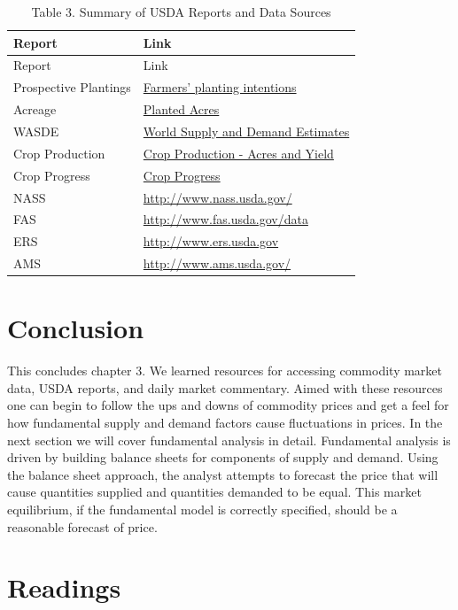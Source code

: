 \documentclass[
]{book}
\begin{document}
\begin{longtable}[]{@{}ll@{}}
\caption{Table 3. Summary of USDA Reports and Data Sources}\tabularnewline
\toprule
Report & Link\tabularnewline
\midrule
\endfirsthead
\toprule
Report & Link\tabularnewline
\midrule
\endhead
Prospective Plantings & \href{https://usda.library.cornell.edu/concern/publications/x633f100h?locale=en}{Farmers' planting intentions}\tabularnewline
Acreage & \href{https://usda.library.cornell.edu/concern/publications/j098zb09z}{Planted Acres}\tabularnewline
WASDE & \href{https://www.usda.gov/oce/commodity/wasde}{World Supply and Demand Estimates}\tabularnewline
Crop Production & \href{https://usda.library.cornell.edu/concern/publications/tm70mv177?locale=en}{Crop Production - Acres and Yield}\tabularnewline
Crop Progress & \href{https://usda.library.cornell.edu/concern/publications/8336h188j}{Crop Progress}\tabularnewline
NASS & \url{http://www.nass.usda.gov/}\tabularnewline
FAS & \url{http://www.fas.usda.gov/data}\tabularnewline
ERS & \href{http://www.ers.usda.gov/data-products.aspx}{http://www.ers.usda.gov}\tabularnewline
AMS & \href{http://www.ams.usda.gov/market-news/livestock-poultry-grain\#Grain}{http://www.ams.usda.gov/}\tabularnewline
\bottomrule
\end{longtable}

\hypertarget{conclusion}{%
\section{Conclusion}\label{conclusion}}

This concludes chapter 3. We learned resources for accessing commodity market data, USDA reports, and daily market commentary. Aimed with these resources one can begin to follow the ups and downs of commodity prices and get a feel for how fundamental supply and demand factors cause fluctuations in prices. In the next section we will cover fundamental analysis in detail. Fundamental analysis is driven by building balance sheets for components of supply and demand. Using the balance sheet approach, the analyst attempts to forecast the price that will cause quantities supplied and quantities demanded to be equal. This market equilibrium, if the fundamental model is correctly specified, should be a reasonable forecast of price.

\hypertarget{readings-1}{%
\section{Readings}\label{readings-1}}
\end{document}
